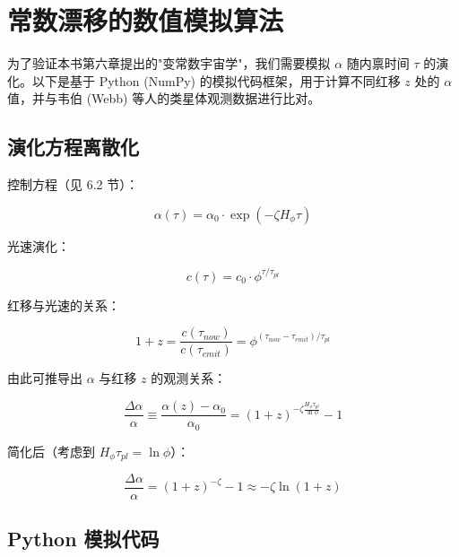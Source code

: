 \hrulefill

\section{常数漂移的数值模拟算法}

为了验证本书第六章提出的"变常数宇宙学"，我们需要模拟 $\alpha$ 随内禀时间 $\tau$ 的演化。以下是基于 Python (NumPy) 的模拟代码框架，用于计算不同红移 $z$ 处的 $\alpha$ 值，并与韦伯 (Webb) 等人的类星体观测数据进行比对。

\subsection{演化方程离散化}

控制方程（见 6.2 节）：

\[\alpha(\tau) = \alpha_0 \cdot \exp(-\zeta H_\phi \tau)\]

光速演化：

\[c(\tau) = c_0 \cdot \phi^{\tau/\tau_{pl}}\]

红移与光速的关系：

\[1 + z = \frac{c(\tau_{now})}{c(\tau_{emit})} = \phi^{(\tau_{now} - \tau_{emit})/\tau_{pl}}\]

由此可推导出 $\alpha$ 与红移 $z$ 的观测关系：

\[\frac{\Delta \alpha}{\alpha} \equiv \frac{\alpha(z) - \alpha_0}{\alpha_0} = (1+z)^{-\zeta \frac{H_\phi \tau_{pl}}{\ln \phi}} - 1\]

简化后（考虑到 $H_\phi \tau_{pl} = \ln \phi$）：

\[\frac{\Delta \alpha}{\alpha} = (1+z)^{-\zeta} - 1 \approx -\zeta \ln(1+z)\]

\subsection{Python 模拟代码}

